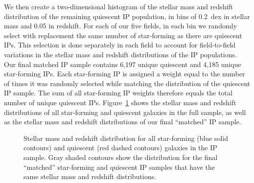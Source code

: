 

We then create a two-dimensional histogram of the stellar mass and redshift distribution of the remaining quiescent IP population, in bins of 0.2~dex in stellar mass and 0.05 in redshift.
For each of our five fields, in each bin we randomly select with replacement the same number of star-forming as there are quiescent IPs.
This selection is done separately in each field to account for field-to-field variations in the stellar mass and redshift distributions of the IP populations.
Our final matched IP sample contains 6,197 unique quiescent and 4,185 unique star-forming IPs.
Each star-forming IP is assigned a weight equal to the number of times it was randomly selected while matching the distribution of the quiescent IP sample.
The sum of all star-forming IP weights therefore equals the total number of unique quiescent IPs.
Figure~\ref{fig:IPsample_matched} shows the stellar mass and redshift distributions of all star-forming and quiescent galaxies in the full sample, as well as the stellar mass and redshift distributions of our final ``matched'' IP sample.

\begin{figure}
  \epstrim{0.6in 0.2in 0.2in 0.4in}
  \caption{Stellar mass and redshift distribution for all star-forming (blue solid contours) and quiescent (red dashed contours) galaxies in the IP sample. 
Gray shaded contours show the distribution for the final ``matched'' star-forming and quiescent IP samples that have the same stellar mass and redshift distributions.
}
  \label{fig:IPsample_matched}
\end{figure}


